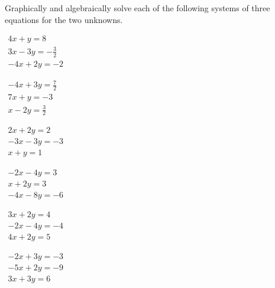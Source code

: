 \begin{exercise}  
Graphically and algebraically solve each of the following systems of three equations for the two unknowns.
\begin{Parts}
\item \(\begin{array}{l} 4x +y=8 \\ 3x -3y=-\frac32 \\ -4x +2y=-2  \end{array}\)

\item \(\begin{array}{l} -4x +3y=\frac72 \\ 7x +y=-3 \\ x -2y=\frac32  \end{array}\)

\begin{OmitV1}
\item \(\begin{array}{l} 2x +2y=2 \\ -3x -3y=-3 \\ x+y=1  \end{array}\)

\item \(\begin{array}{l} -2x -4y=3 \\ x +2y=3 \\ -4x -8y=-6  \end{array}\)
\end{OmitV1}

\item \(\begin{array}{l} 3x +2y=4 \\ -2x -4y=-4 \\ 4x +2y=5  \end{array}\)

\item \(\begin{array}{l} -2x +3y=-3 \\ -5x +2y=-9 \\ 3x +3y=6  \end{array}\)

\end{Parts}
\end{exercise}







